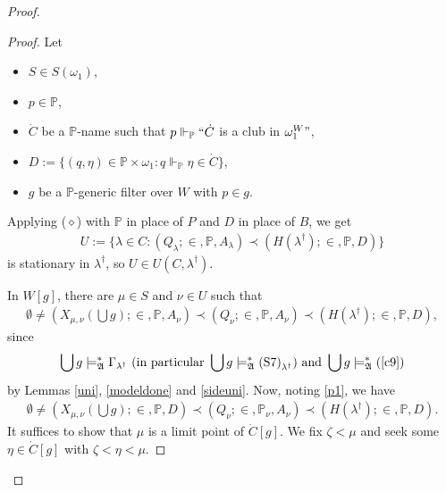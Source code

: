 \documentclass[12pt, twoside]{memoir}
\numberwithin{equation}{section}
\theoremstyle{definition}
\theoremstyle{remark}
\theoremstyle{definition}
\theoremstyle{definition}
\theoremstyle{definition}
\theoremstyle{remark}
\begin{document}
\begin{proof}
\begin{proof}
Let 
\begin{itemize}
    \item $S \in S(\omega_1)$,
    \item $p \in \mathbb{P}$,
    \item $\dot{C}$ be a $\mathbb{P}$-name such that $p \Vdash_{\mathbb{P}} ``\dot{C}$ is a club in $\omega_1^W"$,
    \item $D := \{(q, \eta) \in \mathbb{P} \times \omega_1 : q \Vdash_{\mathbb{P}} \eta \in \dot{C}\}$,
    \item $g$ be a $\mathbb{P}$-generic filter over $W$ with $p \in g$.
\end{itemize}
Applying ($\diamond$) with $\mathbb{P}$ in place of $P$ and $D$ in place of $B$, we get
\begin{align*}
    U := \{\lambda \in C : (Q_{\lambda}; \in, \mathbb{P}, A_{\lambda}) \prec (H(\lambda^{\dagger}); \in, \mathbb{P}, D)\}
\end{align*}
is stationary in $\lambda^{\dagger}$, so $U \in U(C, \lambda^{\dagger})$.

In $W[g]$, there are $\mu \in S$ and $\nu \in U$ such that 
\begin{align*}
    \emptyset \neq (X_{\mu, \nu}(\bigcup g); \in, \mathbb{P}, A_{\nu}) \prec (Q_{\nu}; \in, \mathbb{P}, A_{\nu}) \prec (H(\lambda^{\dagger}); \in, \mathbb{P}, D),
\end{align*}
since $$\bigcup g \models^*_{\mathfrak{A}} \Gamma_{\lambda^{\dagger}} \text{ (in particular } \bigcup g \models^*_{\mathfrak{A}} \text{(S7)}_{\lambda^{\dagger}} \text{) and } \bigcup g \models^*_{\mathfrak{A}} \text{(}\ref{c9}\text{)}$$ by Lemmas \ref{uni}, \ref{modeldone} and \ref{sideuni}. Now, noting \ref{p1}, we have 
\begin{align}\label{eseq}
    \emptyset \neq (X_{\mu, \nu}(\bigcup g); \in, \mathbb{P}, D) \prec (Q_{\nu}; \in, \mathbb{P}_{\nu}, A_{\nu}) \prec (H(\lambda^{\dagger}); \in, \mathbb{P}, D).
\end{align}
It suffices to show that $\mu$ is a limit point of $\dot{C}[g]$. We fix $\zeta < \mu$ and seek some $\eta \in \dot{C}[g]$ with $\zeta < \eta < \mu$. 


\end{proof}
\end{proof}
\end{document}
